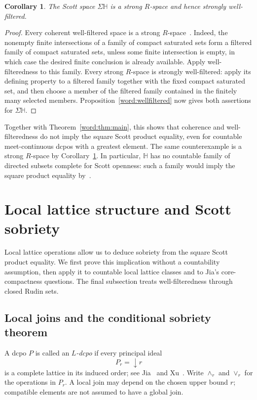 \documentclass[10pt,a4paper]{article}
\newtheorem{corollary}[theorem]{Corollary}
\theoremstyle{definition}
\newcommand{\HH}{\mathbb H}
\begin{document}
\begin{corollary}\label{word:strong-R}
The Scott space $\Sigma\HH$ is a strong $R$-space and hence strongly well-filtered.
\end{corollary}
\begin{proof}
Every coherent well-filtered space is a strong $R$-space~\cite{XXC}. Indeed, the nonempty finite intersections of a family of compact saturated sets form a filtered family of compact saturated sets, unless some finite intersection is empty, in which case the desired finite conclusion is already available. Apply well-filteredness to this family. Every strong $R$-space is strongly well-filtered: apply its defining property to a filtered family together with the fixed compact saturated set, and then choose a member of the filtered family contained in the finitely many selected members. Proposition~\ref{word:wellfiltered} now gives both assertions for $\Sigma\HH$.
\end{proof}

Together with Theorem~\ref{word:thm:main}, this shows that coherence and well-filteredness do not imply the square Scott product equality, even for countable meet-continuous dcpos with a greatest element. The same counterexample is a strong $R$-space by Corollary~\ref{word:strong-R}. In particular, $\HH$ has no countable family of directed subsets complete for Scott openness: such a family would imply the square product equality by~\cite[Proposition~2.4(2)]{Xu}.

\section{Local lattice structure and Scott sobriety}\label{sec:local}
Local lattice operations allow us to deduce sobriety from the square Scott product equality. We first prove this implication without a countability assumption, then apply it to countable local lattice classes and to Jia's core-compactness questions. The final subsection treats well-filteredness through closed Rudin sets.

\subsection{Local joins and the conditional sobriety theorem}\label{local:subsec:joins}
A dcpo $P$ is called an \emph{$L$-dcpo} if every principal ideal
\[
 P_r={\downarrow} r
\]
is a complete lattice in its induced order; see Jia~\cite[Section~4.4]{Jia} and Xu~\cite[Definition~3.1]{Xu}. Write $\wedge_r$ and $\vee_r$ for the operations in $P_r$. A local join may depend on the chosen upper bound $r$; compatible elements are not assumed to have a global join.
\end{document}
